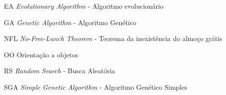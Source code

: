 \documentclass[
	12pt,				%
	openright,			%
	twoside,			%
	a4paper,			%
	english,			%
	brazil				%
	]{abntex2}
\begin{document}
\listoftables*
\cleardoublepage

\begin{siglas}
	\item[EA] \textit{Evolutionary Algorithm} - Algoritmo evolucionário
	\item[GA] \textit{Genetic Algorithm}	- Algoritmo Genético
	\item[NFL] \textit{No-Free-Lunch Theorem} - Teorema da inexistência do almoço grátis
	\item[OO] Orientação a objetos
	\item[RS] \textit{Random Search} - Busca Aleatória
	\item[SGA] \textit{Simple Genetic Algorithm} - Algoritmo Genético Simples
\end{siglas}


\tableofcontents*
\cleardoublepage



\textual



\end{document}
